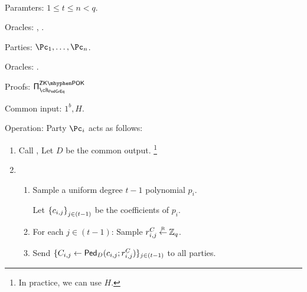 \begin{protocol}\label{prot:TshEG:KG}~
	
	
	\item[Paramters:] $1\le t\le n <q$.
	
	\item[Oracles:] \randomH, \Mult.
	
	
	\item[Parties:] $\Pc_1,\ldots,\Pc_n$.

	\item[Oracles:] \Mult.
	
	\item[Proofs:] $\piZKPOK{\rPedGEq}$
			
	\item[Common input:]	$1^b,H$.
	
	
	\item[Operation:] Party $\Pc_i$ acts as follows:
	
	
	\begin{enumerate}

       
        \item Call \randomH, Let $D$ be the common output. \footnote{In practice, we can use $H$.}
        
        
    	\item  	{}
    
   
		\begin{enumerate}  
			
			\item Sample  a uniform degree $t-1$ polynomial  $p_i$.   
			
			Let $\set{c_{i,j}}_{j\in (t-1)}$ be the coefficients of  $p_i$. 			
			
			
			
			\item For each $j\in (t-1)$: Sample   $r^C_{i,j} \mathbin{\stackrel{\mbox{\tiny R}}{\leftarrow}}\mathbb{Z}_q$. 
			
			\item Send   $\{C_{i,j} \leftarrow \mathsf{Ped}_D(c_{i,j};r^C_{i,j})\}_{j\in (t-1)}$  to all parties. 
			
			
			
			
			\end{enumerate}
			

\end{enumerate}
\end{protocol}
